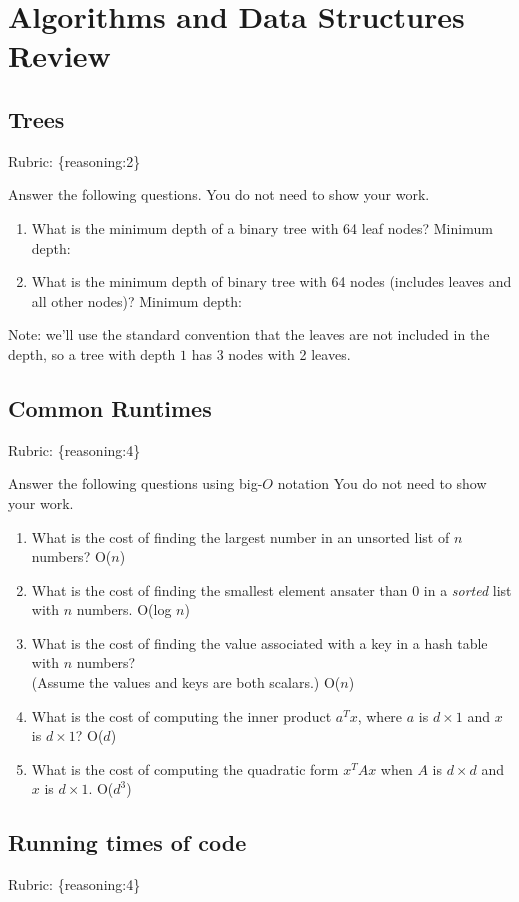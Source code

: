 \documentclass{article}
\def\rubric#1{\gre{Rubric: \{#1\}}}{}
\def\blu#1{{\color{blu}#1}}
\def\gre#1{{\color{gre}#1}}
\def\ans#1{{\color{ans}#1}}
\begin{document}
\section{Algorithms and Data Structures Review}

\subsection{Trees}
\rubric{reasoning:2}

\blu{Answer the following questions.} You do not need to show your work.

\begin{enumerate}
\item What is the minimum depth of a binary tree with 64 leaf nodes? \ans{Minimum depth: }
\item What is the minimum depth of binary tree with 64 nodes (includes leaves and all other nodes)? \ans{Minimum depth: }
\end{enumerate}
Note: we'll use the standard convention that the leaves are not included in the depth, so a tree with depth $1$ has 3 nodes with 2 leaves.

\subsection{Common Runtimes}
\rubric{reasoning:4}

\blu{Answer the following questions using big-$O$ notation} You do not need to show your work.
\begin{enumerate}
\item What is the cost of finding the largest number in an unsorted list of $n$ numbers? \ans{O($n$)}
\item What is the cost of finding the smallest element ansater than 0 in a \emph{sorted} list with $n$ numbers. \ans{O(log $n$)}
\item What is the cost of finding the value associated with a key in a hash table with $n$ numbers? \\(Assume the values and keys are both scalars.) \ans{O($n$)}
\item What is the cost of computing the inner product $a^Tx$, where $a$ is $d \times 1$ and $x$ is $d \times 1$? \ans{O($d$)}
\item What is the cost of computing the quadratic form $x^TAx$ when $A$ is $d \times d$ and $x$ is $d \times 1$. \ans{O($d^3$)}
\end{enumerate}

\subsection{Running times of code}
\rubric{reasoning:4}
\end{document}
